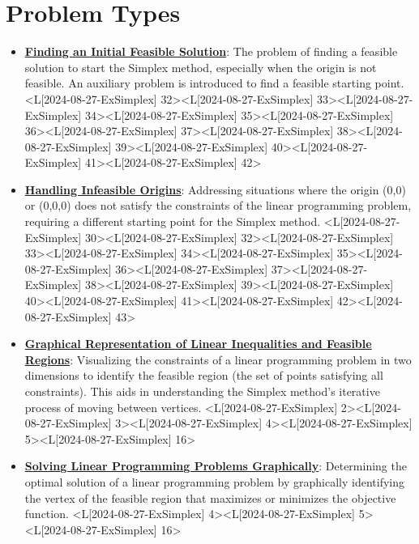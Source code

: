 \documentclass{article}%
\begin{document}
\section{Problem Types}%
\label{sec:ProblemTypes}%
\begin{itemize}[[leftmargin=*]]%
\item \href{https://www.math.purdue.edu/~yipn/421/2024-08-27-ExSimplex.pdf#page=32}{\textbf{Finding an Initial Feasible Solution}}: The problem of finding a feasible solution to start the Simplex method, especially when the origin is not feasible. An auxiliary problem is introduced to find a feasible starting point. <L[2024-08-27-ExSimplex] 32><L[2024-08-27-ExSimplex] 33><L[2024-08-27-ExSimplex] 34><L[2024-08-27-ExSimplex] 35><L[2024-08-27-ExSimplex] 36><L[2024-08-27-ExSimplex] 37><L[2024-08-27-ExSimplex] 38><L[2024-08-27-ExSimplex] 39><L[2024-08-27-ExSimplex] 40><L[2024-08-27-ExSimplex] 41><L[2024-08-27-ExSimplex] 42>%
\item \href{https://www.math.purdue.edu/~yipn/421/2024-08-27-ExSimplex.pdf#page=30}{\textbf{Handling Infeasible Origins}}: Addressing situations where the origin (0,0) or (0,0,0) does not satisfy the constraints of the linear programming problem, requiring a different starting point for the Simplex method. <L[2024-08-27-ExSimplex] 30><L[2024-08-27-ExSimplex] 32><L[2024-08-27-ExSimplex] 33><L[2024-08-27-ExSimplex] 34><L[2024-08-27-ExSimplex] 35><L[2024-08-27-ExSimplex] 36><L[2024-08-27-ExSimplex] 37><L[2024-08-27-ExSimplex] 38><L[2024-08-27-ExSimplex] 39><L[2024-08-27-ExSimplex] 40><L[2024-08-27-ExSimplex] 41><L[2024-08-27-ExSimplex] 42><L[2024-08-27-ExSimplex] 43>%
\item \href{https://www.math.purdue.edu/~yipn/421/2024-08-27-ExSimplex.pdf#page=2}{\textbf{Graphical Representation of Linear Inequalities and Feasible Regions}}: Visualizing the constraints of a linear programming problem in two dimensions to identify the feasible region (the set of points satisfying all constraints). This aids in understanding the Simplex method's iterative process of moving between vertices. <L[2024-08-27-ExSimplex] 2><L[2024-08-27-ExSimplex] 3><L[2024-08-27-ExSimplex] 4><L[2024-08-27-ExSimplex] 5><L[2024-08-27-ExSimplex] 16>%
\item \href{https://www.math.purdue.edu/~yipn/421/2024-08-27-ExSimplex.pdf#page=4}{\textbf{Solving Linear Programming Problems Graphically}}: Determining the optimal solution of a linear programming problem by graphically identifying the vertex of the feasible region that maximizes or minimizes the objective function. <L[2024-08-27-ExSimplex] 4><L[2024-08-27-ExSimplex] 5><L[2024-08-27-ExSimplex] 16>%

\end{itemize}
\end{document}
